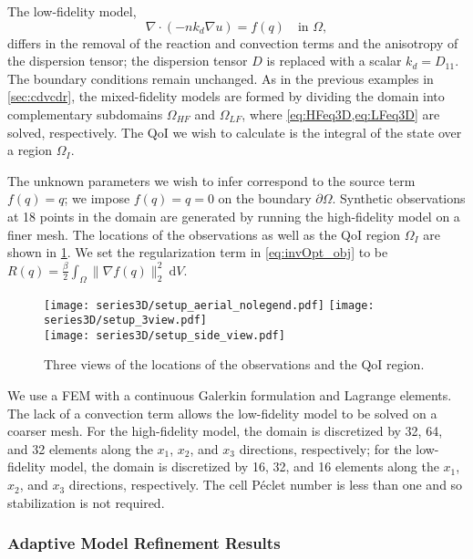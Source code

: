 The low-fidelity model,
%
\begin{equation}
\nabla\cdot(- nk_d\nabla u) = f(q) \quad \text{in } \Omega, \label{eq:LFeq3D}
\end{equation}
%
differs in the removal of the reaction and convection terms and the anisotropy of the dispersion tensor; the dispersion tensor $D$ is replaced with a scalar $k_d=D_{11}$. The boundary conditions remain unchanged. As in the previous examples in \cref{sec:cdvcdr}, the mixed-fidelity models are formed by dividing the domain into complementary subdomains $\Omega_{HF}$ and $\Omega_{LF}$, where \cref{eq:HFeq3D,eq:LFeq3D} are solved, respectively. The QoI we wish to calculate is the integral of the state over a region $\Omega_I$.

The unknown parameters we wish to infer correspond to the source term $f(q)=q$; we impose $f(q)=q=0$ on the boundary $\partial\Omega$. Synthetic observations at 18 points in the domain are generated by running the high-fidelity model on a finer mesh. The locations of the observations as well as the QoI region $\Omega_I$ are shown in \cref{fig:setup3D}. We set the regularization term in \cref{eq:invOpt_obj} to be $R(q)=\frac{\beta}{2}\int_\Omega \|\nabla f(q)\|_2^2\:\textrm{d}V$.
%
\begin{figure}[htbp]
\centering
\texttt{[image: series3D/setup\_aerial\_nolegend.pdf]} \hfill
\texttt{[image: series3D/setup\_3view.pdf]} \\
\vspace{\baselineskip}
\texttt{[image: series3D/setup\_side\_view.pdf]}
\caption{Three views of the locations of the observations and the QoI region.}
\label{fig:setup3D}
\end{figure}
%

We use a FEM with a continuous Galerkin formulation and Lagrange elements. The lack of a convection term allows the low-fidelity model to be solved on a coarser mesh. For the high-fidelity model, the domain is discretized by 32, 64, and 32 elements along the $x_1$, $x_2$, and $x_3$ directions, respectively; for the low-fidelity model, the domain is discretized by 16, 32, and 16 elements along the $x_1$, $x_2$, and $x_3$ directions, respectively. The cell P\'{e}clet number is less than one and so stabilization is not required.

\subsubsection{Adaptive Model Refinement Results} \label{sec:ref3D_diffmesh}

